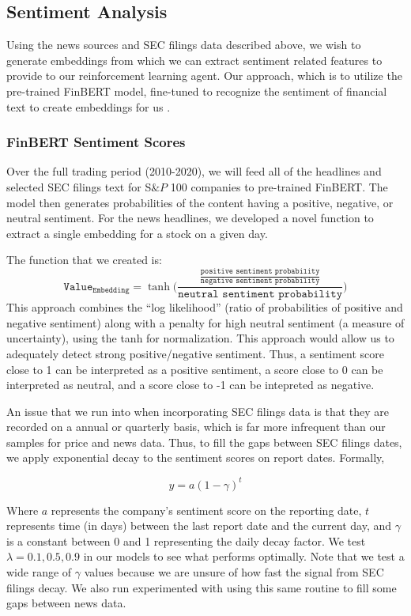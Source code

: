 \subsection{Sentiment Analysis}

Using the news sources and SEC filings data described above, we wish to 
generate embeddings from which we can extract sentiment related features 
to provide to our reinforcement learning agent. Our approach, which is to utilize the pre-trained 
FinBERT model, fine-tuned to recognize the sentiment of financial text to 
create embeddings for us \cite{finbert}. 

\subsubsection{FinBERT Sentiment Scores}\label{finbert}

Over the full trading period (2010-2020), we will feed all of the headlines and selected SEC filings text for S$\&P$ 100 companies to pre-trained FinBERT. 
The model then generates probabilities of the content having a positive, negative, or neutral sentiment. For the news headlines, we developed a novel function to extract a single embedding for a stock on a given day. 

The function that we created is:
\[\texttt{Value}_{\texttt{Embedding}} = \tanh\Biggl( \frac{\frac{\texttt{positive sentiment probability}}{\texttt{negative sentiment probability}}}{\texttt{neutral sentiment probability}} \Biggr)\]
This approach combines the “log likelihood” (ratio of probabilities of positive and 
negative sentiment) along with a penalty for high neutral sentiment (a measure of 
uncertainty), using the tanh for normalization. This approach would allow us to 
adequately detect strong positive/negative sentiment. Thus, a sentiment score close to 1 can be interpreted as a positive sentiment, a score close to 0 can be interpreted as neutral, and a score close to -1 can be intepreted as negative.

An issue that we run into when incorporating SEC filings data is that they are recorded on a annual or quarterly basis, which is far more infrequent than our samples for price and news data.
Thus, to fill the gaps between SEC filings dates, we apply exponential decay to the sentiment scores on report dates. Formally,

$$
y = a(1 - \gamma)^t
$$

Where $a$ represents the company's sentiment score on the reporting date, $t$ represents time (in days) between the last report date and the current day, and $\gamma$ is a constant between 0 and 1 representing the daily decay factor. We test $\lambda = 0.1, 0.5, 0.9$ in our models to see what performs optimally. Note that we test a wide range of $\gamma$ values because we are unsure of how fast the signal from SEC filings decay. We also run experimented with using this same routine to fill some gaps between news data.
 
